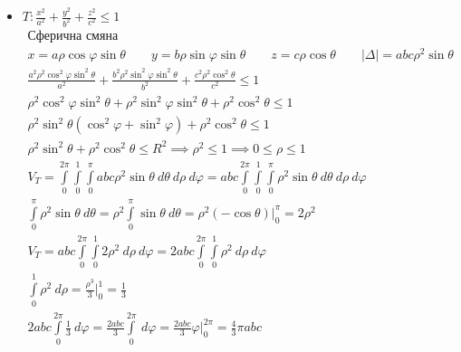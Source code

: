\documentclass[a4paper,fleqn,12pt]{article}
\theoremstyle{definition}
\begin{document}
\begin{itemize}
\item $T: \frac{x^2}{a^2} + \frac{y^2}{b^2} +  \frac{z^2}{c^2} \leq 1$\\
\begin{gather*}
\text{Сферична смяна} \\
x = a\rho \cos \varphi \sin \theta \qquad
 y = b\rho \sin \varphi \sin \theta \qquad  
z = c\rho \cos \theta \qquad 
|\Delta| = abc\rho^2\sin\theta \\
\frac{a^2\rho^2 \cos^2 \varphi \sin^2 \theta}{a^2} + \frac{b^2\rho^2 \sin^2 \varphi \sin^2 \theta }{b^2} + \frac{c^2 \rho^2 \cos^2 \theta}{c^2} \leq 1 \\
\rho^2 \cos^2 \varphi \sin^2 \theta + \rho^2 \sin^2 \varphi \sin^2 \theta + \rho^2 \cos^2 \theta \leq  1 \\
\rho^2 \sin^2 \theta (\cos^2 \varphi + \sin^2 \varphi) + \rho^2 \cos^2 \theta \leq 1 \\
\rho^2 \sin^2 \theta + \rho^2 \cos^2 \theta \leq R^2 \implies \rho^2 \leq 1 \implies 0 \leq \rho \leq 1 \\
V_T = \int\limits_0 ^{2\pi} \int\limits_0 ^{1} \int\limits_0 ^{\pi} abc\rho^2 \sin \theta \ d \theta \ d \rho \ d \varphi = 
abc \int\limits_0 ^{2\pi} \int\limits_0 ^{1} \int\limits_0 ^{\pi} \rho^2 \sin \theta \ d \theta \ d \rho \ d \varphi \\
\int\limits_0 ^{\pi} \rho^2 \sin \theta \ d \theta = 
\rho^2 \int\limits_0 ^{\pi} \sin \theta \ d \theta = 
\rho^2 (- \cos \theta)\Big|_0 ^{\pi} = 2 \rho^2 \\
V_T = abc \int\limits_0 ^{2\pi} \int\limits_0 ^{1}  2 \rho^2 \ d \rho \ d \varphi =
2 abc \int\limits_0 ^{2\pi} \int\limits_0 ^{1} \rho^2 \ d \rho \ d \varphi \\
\int\limits_0 ^{1} \rho^2 \ d \rho = \frac{\rho^3}{3} \Big|_0 ^{1} = \frac{1}{3} \\
2 abc \int\limits_0 ^{2\pi}  \frac{1}{3} \ d \varphi = 
\frac{2abc}{3} \int\limits_0 ^{2\pi} \ d \varphi = \frac{2abc}{3} \varphi \Big|_0 ^{2\pi} = \frac{4}{3} \pi abc 
\end{gather*}
\end{itemize}
\end{document}
